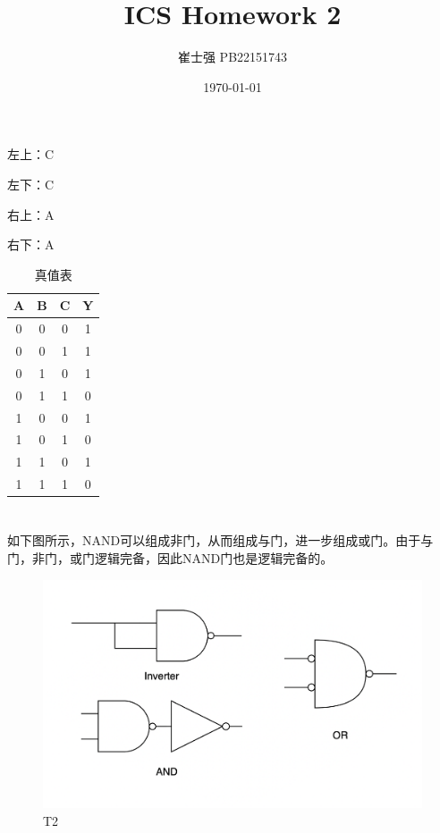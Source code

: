\documentclass[UTF8]{ctexart}
\title{ICS Homework 2}
\author{崔士强 PB22151743}
\date{\today}
\begin{document}
\maketitle
\section{}  %
左上：C

左下：C    

右上：A    

右下：A 

\begin{table}[H]\centering
  \setlength{\tabcolsep}{8mm}
  \begin{tabular}{ccc|c}
    \hline\hline
    A & B & C & Y \\
    \hline
    0 & 0 & 0 & 1 \\
    0 & 0 & 1 & 1 \\
    0 & 1 & 0 & 1 \\
    0 & 1 & 1 & 0 \\
    1 & 0 & 0 & 1 \\
    1 & 0 & 1 & 0 \\
    1 & 1 & 0 & 1 \\
    1 & 1 & 1 & 0 \\
    \hline\hline
  \end{tabular}
  \caption{真值表}
\end{table}
\section{}  %
如下图所示，NAND可以组成非门，从而组成与门，进一步组成或门。由于与门，非门，或门逻辑完备，因此NAND门也是逻辑完备的。
\clearpage
\begin{figure}[h]
  \centering
  \includegraphics[scale=0.3]{p1.png}
  \caption{T2}
\end{figure}
\end{document}
